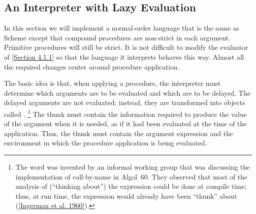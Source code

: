 \subsection{An Interpreter with Lazy Evaluation}
\label{Section 4.2.2}

In this section we will implement a normal-order language that is the same as Scheme except that compound procedures are non-strict in each argument.
Primitive procedures will still be strict.
It is not difficult to modify the evaluator of \cref{Section 4.1.1} so that the language it interprets behaves this way.
Almost all the required changes center around procedure application.

The basic idea is that, when applying a procedure, the interpreter must determine which arguments are to be evaluated and which are to be delayed.
The delayed arguments are not evaluated;
instead, they are transformed into objects called .%
\footnote{
	The word  was invented by an informal working group that was discussing the implementation of call-by-name in Algol~60.
	They observed that most of the analysis of (“thinking about”) the expression could be done at compile time;
	thus, at run time, the expression would already have been “thunk” about (\cref{Ingerman et al. 1960}).
}
The thunk must contain the information required to produce the value of the argument when it is needed, as if it had been evaluated at the time of the application.
Thus, the thunk must contain the argument expression and the environment in which the procedure application is being evaluated.

